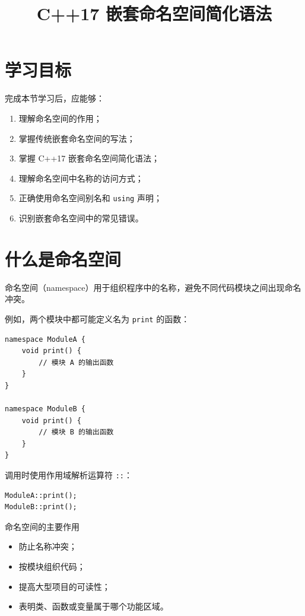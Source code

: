 \documentclass[UTF8,12pt,a4paper]{ctexart}
\title{\textbf{C++17 嵌套命名空间简化语法}}
\author{}
\date{}
\begin{document}
\maketitle

\section{学习目标}

完成本节学习后，应能够：

\begin{enumerate}[label=\arabic*.]
    \item 理解命名空间的作用；
    \item 掌握传统嵌套命名空间的写法；
    \item 掌握 C++17 嵌套命名空间简化语法；
    \item 理解命名空间中名称的访问方式；
    \item 正确使用命名空间别名和 \texttt{using} 声明；
    \item 识别嵌套命名空间中的常见错误。
\end{enumerate}

\section{什么是命名空间}

命名空间（namespace）用于组织程序中的名称，避免不同代码模块之间出现命名冲突。

例如，两个模块中都可能定义名为 \texttt{print} 的函数：

\begin{lstlisting}
namespace ModuleA {
    void print() {
        // 模块 A 的输出函数
    }
}

namespace ModuleB {
    void print() {
        // 模块 B 的输出函数
    }
}
\end{lstlisting}

调用时使用作用域解析运算符 \texttt{::}：

\begin{lstlisting}
ModuleA::print();
ModuleB::print();
\end{lstlisting}

\begin{conceptbox}{命名空间的主要作用}
\begin{itemize}
    \item 防止名称冲突；
    \item 按模块组织代码；
    \item 提高大型项目的可读性；
    \item 表明类、函数或变量属于哪个功能区域。
\end{itemize}
\end{conceptbox}
\end{document}
